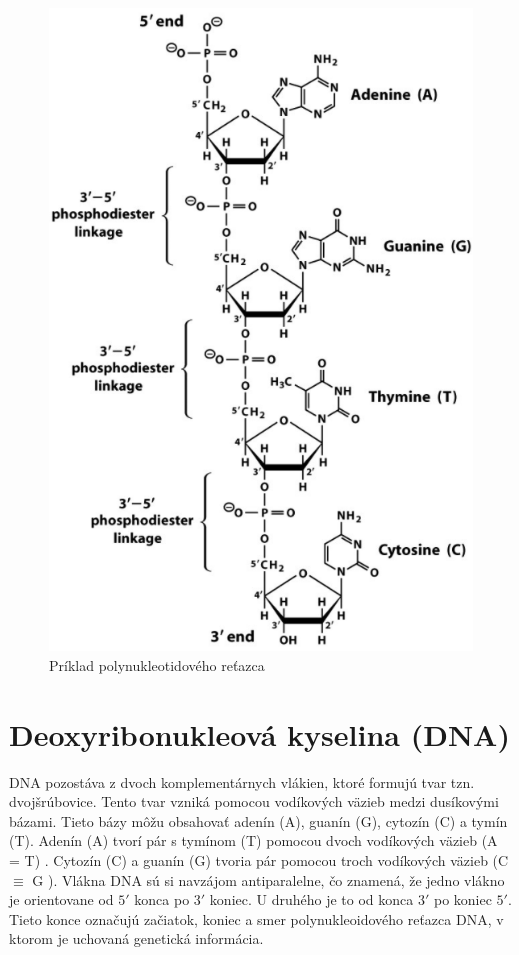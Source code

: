 \begin{figure}[!ht]
\centering
\includegraphics[scale =0.8]{obrazky-figures/polystring.png}
\caption[Príklad polynukleotidového reťazca] {Príklad polynukleotidového reťazca\footnotemark}
\end{figure}





\newpage
{}

\section{Deoxyribonukleová kyselina (DNA)}
\label{vezby}
DNA pozostáva z dvoch komplementárnych vlákien, ktoré formujú tvar tzn. dvojšrúbovice. Tento tvar vzniká pomocou vodíkových väzieb medzi dusíkovými bázami. Tieto bázy môžu obsahovať adenín (A), guanín (G), cytozín (C) a tymín (T). Adenín (A) tvorí pár s tymínom (T) pomocou dvoch vodíkových väzieb (A = T) . Cytozín (C) a guanín (G) tvoria pár pomocou troch vodíkových väzieb (C $\equiv$ G ). Vlákna DNA sú si navzájom antiparalelne, čo znamená, že jedno vlákno je orientovane od $5'$ konca po $3'$ koniec. U druhého je to od konca $3'$ po koniec $5'$. Tieto konce označujú začiatok, koniec a smer polynukleoidového reťazca DNA, v ktorom je uchovaná genetická informácia.

